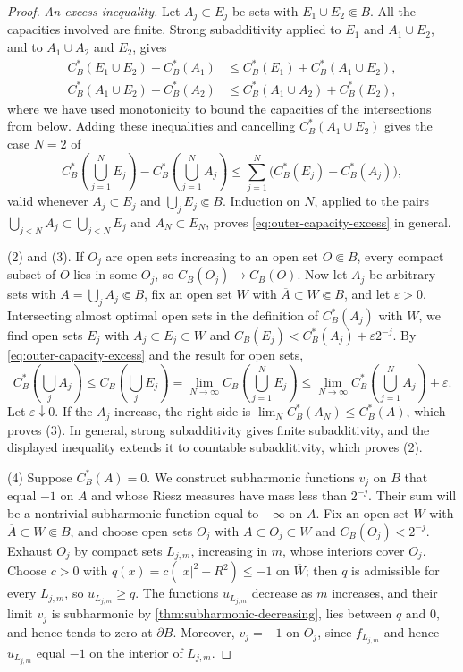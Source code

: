 \begin{proof}
\emph{An excess inequality.} Let $A_j\subset E_j$ be sets with $E_1\cup E_2\Subset B$. All the capacities involved are finite. Strong subadditivity applied to $E_1$ and $A_1\cup E_2$, and to $A_1\cup A_2$ and $E_2$, gives
\[
 \begin{aligned}
 C_B^*(E_1\cup E_2)+C_B^*(A_1)&\leq C_B^*(E_1)+C_B^*(A_1\cup E_2),\\
 C_B^*(A_1\cup E_2)+C_B^*(A_2)&\leq C_B^*(A_1\cup A_2)+C_B^*(E_2),
 \end{aligned}
\]
where we have used monotonicity to bound the capacities of the intersections from below. Adding these inequalities and cancelling $C_B^*(A_1\cup E_2)$ gives the case $N=2$ of
\begin{equation}\label{eq:outer-capacity-excess}
 C_B^*\left(\bigcup_{j=1}^NE_j\right)-C_B^*\left(\bigcup_{j=1}^NA_j\right)
 \leq\sum_{j=1}^N\bigl(C_B^*(E_j)-C_B^*(A_j)\bigr),
\end{equation}
valid whenever $A_j\subset E_j$ and $\bigcup_jE_j\Subset B$. Induction on $N$, applied to the pairs $\bigcup_{j<N}A_j\subset\bigcup_{j<N}E_j$ and $A_N\subset E_N$, proves \eqref{eq:outer-capacity-excess} in general.

(2) and (3). If $O_j$ are open sets increasing to an open set $O\Subset B$, every compact subset of $O$ lies in some $O_j$, so $C_B(O_j)\to C_B(O)$. Now let $A_j$ be arbitrary sets with $A=\bigcup_jA_j\Subset B$, fix an open set $W$ with $\overline A\subset W\Subset B$, and let $\varepsilon>0$. Intersecting almost optimal open sets in the definition of $C_B^*(A_j)$ with $W$, we find open sets $E_j$ with $A_j\subset E_j\subset W$ and $C_B(E_j)<C_B^*(A_j)+\varepsilon2^{-j}$. By \eqref{eq:outer-capacity-excess} and the result for open sets,
\[
 C_B^*\left(\bigcup_j A_j\right)\leq C_B\left(\bigcup_j E_j\right)=\lim_{N\to\infty}C_B\left(\bigcup_{j=1}^NE_j\right)
 \leq\lim_{N\to\infty}C_B^*\left(\bigcup_{j=1}^N A_j\right)+\varepsilon.
\]
Let $\varepsilon\downarrow0$. If the $A_j$ increase, the right side is $\lim_NC_B^*(A_N)\leq C_B^*(A)$, which proves (3). In general, strong subadditivity gives finite subadditivity, and the displayed inequality extends it to countable subadditivity, which proves (2).

(4) Suppose $C_B^*(A)=0$. We construct subharmonic functions $v_j$ on $B$ that equal $-1$ on $A$ and whose Riesz measures have mass less than $2^{-j}$. Their sum will be a nontrivial subharmonic function equal to $-\infty$ on $A$. Fix an open set $W$ with $\overline A\subset W\Subset B$, and choose open sets $O_j$ with $A\subset O_j\subset W$ and $C_B(O_j)<2^{-j}$. Exhaust $O_j$ by compact sets $L_{j,m}$, increasing in $m$, whose interiors cover $O_j$. Choose $c>0$ with $q(x)=c(|x|^2-R^2)\leq-1$ on $\overline W$; then $q$ is admissible for every $L_{j,m}$, so $u_{L_{j,m}}\geq q$. The functions $u_{L_{j,m}}$ decrease as $m$ increases, and their limit $v_j$ is subharmonic by \cref{thm:subharmonic-decreasing}, lies between $q$ and $0$, and hence tends to zero at $\partial B$. Moreover, $v_j=-1$ on $O_j$, since $f_{L_{j,m}}$ and hence $u_{L_{j,m}}$ equal $-1$ on the interior of $L_{j,m}$.


\end{proof}
